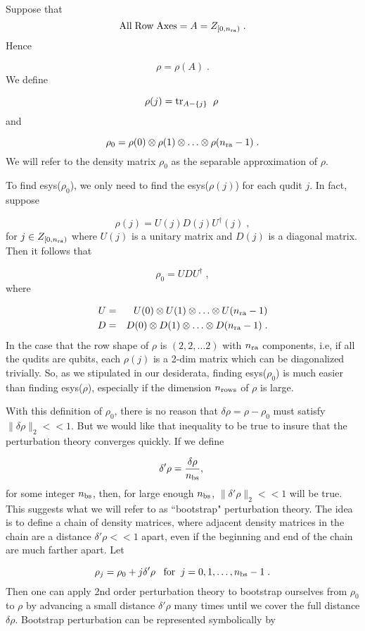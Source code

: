 \documentclass[12pt]{article}%
\newcommand{\tr}[0]{{\rm tr }}
\newcommand{\beq}{\begin{equation}}
\newcommand{\eeq}{\end{equation}}
\newcommand{\beqa}{\begin{eqnarray}}
\newcommand{\eeqa}{\end{eqnarray}}
\newcommand{\nra}[0]{{n_{\rm ra}}}
\newcommand{\nr}[0]{{n_{\rm rows}}}
\newcommand{\nbs}[0]{{n_{\rm bs}}}
\newcommand{\norm}[1]{\parallel #1 \parallel_2}
\begin{document}
Suppose that
\beq
{\rm All\;Row\;Axes} = A = Z_{[0, \nra)}
\;.
\eeq
Hence

\beq
\rho= \rho(A)
\;.
\eeq
We define

\beq
\rho(j) = \tr_{A-\{j\}}
\;\;\rho
\;
\eeq
and

\beq
\rho_0 = \rho(0)\otimes \rho(1)
\otimes\ldots \otimes \rho(\nra-1)
\;.
\eeq
We will refer to the density matrix $\rho_0$ as
the separable approximation of $\rho$.

To find esys($\rho_0$),
we only need to find
the esys($\rho(j)$) for each qudit $j$.
In fact, suppose

\beq
\rho(j) = U(j)D(j)U^\dag(j)
\;,
\eeq
for $j\in Z_{[0, \nra)}$ where $U(j)$
is a unitary matrix and $D(j)$
is a diagonal matrix. Then it follows that

\beq
\rho_0 = UDU^\dag
\;,
\eeq
where

\beqa
U &=& U(0)\otimes U(1)\otimes\ldots\otimes U(\nra-1)
\\
D &=& D(0)\otimes D(1)\otimes\ldots\otimes D(\nra-1)
\;.
\eeqa
In the case that the
row shape
of $\rho$ is $(2,2, \ldots 2)$
with $\nra$ components, i.e, if all the qudits are qubits,
each $\rho(j)$
is a 2-dim matrix which can be diagonalized
trivially. So,
as we stipulated in our desiderata,
finding esys($\rho_0$)
is much easier than finding
esys($\rho$), especially if
the dimension $\nr$ of $\rho$ is large.


With this definition of $\rho_0$,
there is no reason that
$\delta \rho = \rho -\rho_0$
must satisfy
$\norm{\delta\rho}  << 1$.
But we would like that inequality to be true
to insure that the perturbation theory
converges quickly.
If we define

\beq
\delta'\rho = \frac{\delta\rho }{\nbs},
 \;
 \eeq
 for some integer $\nbs$, then,
 for large enough $\nbs$,
 $\norm{\delta'\rho} <<1$
 will be true. This suggests what we
 will refer to as
 ``bootstrap" perturbation theory.
 The idea is to define a chain of
 density matrices, where adjacent
density matrices in the chain are
 a distance
 $\delta'\rho<<1$ apart,
 even if the beginning and end
 of the chain are much farther apart.
 Let

 \beq
 \rho_j = \rho_0 + j \delta'\rho
 \;\;\;{\rm for} \;\;j=0, 1, \ldots, \nbs-1
 \;.
 \eeq
 Then one can apply 2nd order perturbation
 theory to
 bootstrap ourselves
from $\rho_0$ to $\rho$
by advancing a small distance
$\delta'\rho$ many times
until we cover the full distance
$\delta\rho$. Bootstrap perturbation
can be represented symbolically by
\end{document}
